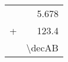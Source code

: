\documentclass[border=1mm,12pt]{standalone}
\def\decA{5.678}
\def\decB{123.4}
\begin{document}
\begin{tabular}{c r}
    & \num{\decA} \\
    + & \num{\decB} \\
    \hline
    & \num{\decAB} \\
    \hline
\end{tabular}
\end{document}
